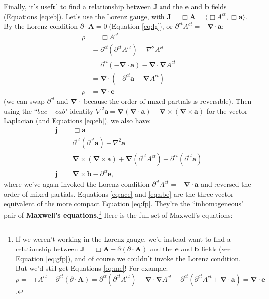 \documentclass[12pt]{article}
\renewcommand{\vv}[1]{\mathbf{#1}}
\newcommand{\del}{\boldsymbol{\nabla}}
\begin{document}
Finally, it's useful to find a relationship between $\vv J$ and the $\vv e$ and $\vv b$ fields (Equations \ref{eq:eb}). Let's use the Lorenz gauge, with $\vv J= \Box \vv A = \langle \Box A^{ct}, \Box \vv a \rangle$. By the Lorenz condition ${\partialup \cdot \vv A = 0}$ (Equation \ref{eq:lg}), or $\partial^{ct} A^{ct} = - \del \cdot \vv a$:
\begin{equation}\label{eq:ace}
\begin{split}
\rho &= \Box A^{ct} \\
&= \partial^{ct} (\partial^{ct} A^{ct}) - \nabla ^2 A^{ct} \\
&= \partial^{ct} (- \del \cdot \vv a) - \del \cdot \del A^{ct} \\
&= \del \cdot (- \partial^{ct} \vv a - \del A^{ct}) \\
\rho &= \del \cdot \vv e
\end{split}
\end{equation}
(we can swap $\partial^{ct}$ and $\del \cdot$ because the order of mixed partials is reversible). Then using the ``$bac - cab$" identity ${\nabla ^2 \vv a = \del(\del \cdot \vv a) - \del \times (\del \times \vv a)}$ for the vector Laplacian (and Equations \ref{eq:eb}), we also have:
\begin{equation}\label{eq:abe}
\begin{split}
\vv j &= \Box \vv a \\
&= \partial^{ct} (\partial^{ct} \vv a) - \nabla ^2 \vv a \\
&= \del \times (\del \times \vv a) + \del(\partial^{ct} A^{ct}) + \partial^{ct} (\partial^{ct} \vv a) \\
\vv j &=  \del \times \vv b - \partial^{ct} \vv e ,
\end{split}
\end{equation}
where we've again invoked the Lorenz condition $\partial^{ct} A^{ct} = - \del \cdot \vv a$ and reversed the order of mixed partials. Equations \ref{eq:ace} and \ref{eq:abe} are the three-vector equivalent of the more compact Equation \ref{eq:fp}. They're the ``inhomogeneous" pair of \textbf{Maxwell's equations}.\footnote{If we weren't working in the Lorenz gauge, we'd instead want to find a relationship between $\vv J = \Box \vv A - \partialup (\partialup \cdot \vv A)$ and the $\vv e$ and $\vv b$ fields (see Equation \ref{eq:gfp}), and of course we couldn't invoke the Lorenz condition. But we'd still get Equations \ref{eq:me}! For example: $\rho = \Box A^{ct} - \partial^{ct}(\partialup \cdot \vv A) = \partial^{ct} (\partial^{ct} A^{ct}) - \del \cdot \del A^{ct} - \partial^{ct} (\partial^{ct} A^{ct} + \del \cdot \vv a) = \del \cdot \vv e$.} Here is the full set of Maxwell's equations:
\end{document}
